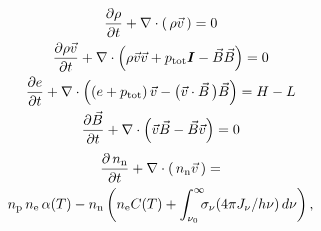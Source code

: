 \begin{gather}
  {\partial \rho \over\partial t}
  +\nabla\cdot\left(\,\rho \vec v\,\right)  = 0  \label{mhd1}
  \\
 {\partial \rho \vec v \over\partial t}
  +\nabla\cdot
  \left(\rho \vec v \vec v + p_{\mathrm{tot}} \boldsymbol I-\vec B \vec B\right)=0
 \label{mhd2}
 \\
 {\partial e \over\partial t}
  +\nabla\cdot
  \left( \left(e+p_{\mathrm{tot}}\right)\vec v
    - \bigl(\vec v \cdot \vec B\,\bigr)\vec B\right) = H - L
 \label{mhd3}
 \\
 {\partial \vec B \over\partial t}
  +\nabla\cdot
  \left(\vec v \vec B - \vec B \vec v\right) =0
 \label{mhd4}
\end{gather}
\newcommand\Hp{_\mathrm{p}}
\newcommand\Hz{_\mathrm{n}}
\begin{multline}
  {\partial\, n\Hz \over\partial t}
  + \nabla \cdot \left(\,n\Hz \vec v\,\right) = \\
  n\Hp\, n_{\mathrm{e}}\, \alpha(T) - n\Hz \left( n_{\mathrm{e}} C(T)  + 
   \int_{\nu_0}^\infty \!\!\!\sigma_\nu (4 \pi J_\nu / h\nu) \,d\nu \right),  
 \label{mhd5}
\end{multline}
%
